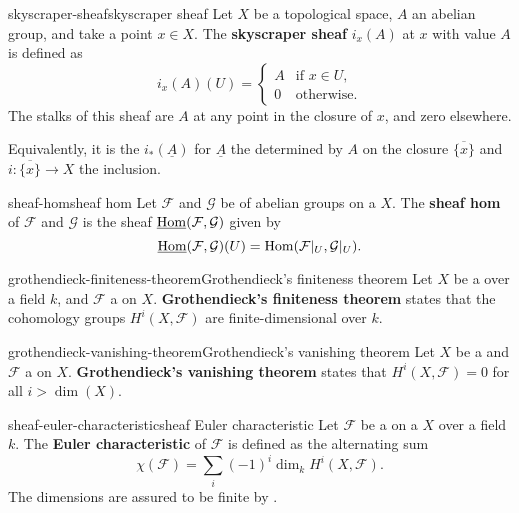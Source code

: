 \begin{topic}{skyscraper-sheaf}{skyscraper sheaf}
    Let $X$ be a topological space, $A$ an abelian group, and take a point $x \in X$. The \textbf{skyscraper sheaf} $i_x(A)$ at $x$ with value $A$ is defined as
    \[ i_x(A) (U) = \left\{ \begin{array}{cl} A & \text{if } x \in U, \\ 0 & \text{otherwise.} \end{array} \right. \]
    The stalks of this sheaf are $A$ at any point in the closure of $x$, and zero elsewhere.
    
    Equivalently, it is the  $i_*(\underline{A})$ for $\underline{A}$ the  determined by $A$ on the closure $\overline{\{ x \}}$ and $i : \overline{\{ x \}} \to X$ the inclusion.
\end{topic}

\begin{topic}{sheaf-hom}{sheaf hom}
    Let $\mathcal{F}$ and $\mathcal{G}$ be  of abelian groups on a  $X$. The \textbf{sheaf hom} of $\mathcal{F}$ and $\mathcal{G}$ is the sheaf $\operatorname{\underline{Hom}}(\mathcal{F}, \mathcal{G})$ given by
    \[ \operatorname{\underline{Hom}}(\mathcal{F}, \mathcal{G})(U) = \operatorname{Hom}(\mathcal{F}|_U, \mathcal{G}|_U) . \]
\end{topic}

\begin{topic}{grothendieck-finiteness-theorem}{Grothendieck's finiteness theorem}
    Let $X$ be a   over a field $k$, and $\mathcal{F}$ a  on $X$. \textbf{Grothendieck's finiteness theorem} states that the cohomology groups $H^i(X, \mathcal{F})$ are finite-dimensional over $k$.
\end{topic}

\begin{topic}{grothendieck-vanishing-theorem}{Grothendieck's vanishing theorem}
    Let $X$ be a   and $\mathcal{F}$ a  on $X$. \textbf{Grothendieck's vanishing theorem} states that $H^i(X, \mathcal{F}) = 0$ for all $i > \dim(X)$.
\end{topic}

\begin{topic}{sheaf-euler-characteristic}{sheaf Euler characteristic}
    Let $\mathcal{F}$ be a  on a  $X$  over a field $k$. The \textbf{Euler characteristic} of $\mathcal{F}$ is defined as the alternating sum
    \[ \chi(\mathcal{F}) = \sum_{i} (-1)^i \dim_k H^i(X, \mathcal{F}) . \]
    The dimensions are assured to be finite by .
\end{topic}

